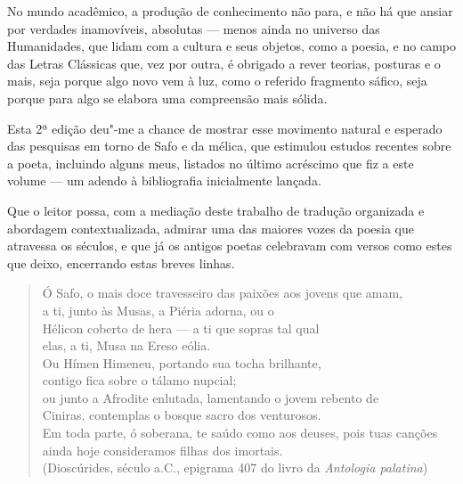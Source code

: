 No mundo acadêmico, a produção de conhecimento não para, e não há que
ansiar por verdades inamovíveis, absolutas --- menos ainda no universo
das Humanidades, que lidam com a cultura e seus objetos, como a poesia,
e no campo das Letras Clássicas que, vez por outra, é obrigado a rever
teorias, posturas e o mais, seja porque algo novo vem à luz, como o referido fragmento sáfico, seja porque para algo se elabora uma compreensão mais
sólida.

Esta 2ª edição deu"-me a chance de mostrar esse movimento natural e
esperado das pesquisas em torno de Safo e da mélica, que estimulou
estudos recentes sobre a poeta, incluindo alguns meus, listados no
último acréscimo que fiz a este volume --- um adendo à bibliografia
inicialmente lançada.

Que o leitor possa, com a mediação deste trabalho de tradução organizada
e abordagem contextualizada, admirar uma das maiores vozes da poesia que
atravessa os séculos, e que já os antigos poetas celebravam com versos
como estes que deixo, encerrando estas breves linhas.

\begin{verse}
Ó Safo, o mais doce travesseiro das paixões aos jovens que amam,\\
a ti, junto às Musas, a Piéria adorna, ou o\\
Hélicon coberto de hera --- a ti que sopras tal qual\\
elas, a ti, Musa na Ereso eólia.\\
Ou Hímen Himeneu, portando sua tocha brilhante,\\
contigo fica sobre o tálamo nupcial;\\
ou junto a Afrodite enlutada, lamentando o jovem rebento de\\
Ciniras, contemplas o bosque sacro dos venturosos.\\
Em toda parte, ó soberana, te saúdo como aos deuses, pois tuas canções\\
ainda hoje consideramos filhas dos imortais.\\[5pt]
(Dioscúrides, século  a.C., epigrama 407 do livro  da
\emph{Antologia palatina})
\end{verse}
